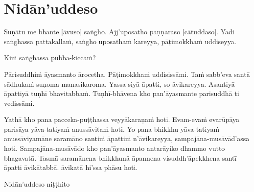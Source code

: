 \section{Nidān'uddeso}
\label{nidan'uddeso}

Suṇātu me bhante [āvuso] saṅgho. Ajj’uposatho paṇṇaraso [cātuddaso]. Yadi saṅghassa pattakallaṁ, saṅgho uposathaṁ kareyya, pāṭimokkhaṁ uddiseyya.

Kiṁ saṅghassa pubba-kiccaṁ?

Pārisuddhiṁ āyasmanto ārocetha. Pāṭimokkhaṁ uddisissāmi. Taṁ sabb'eva santā sādhukaṁ suṇoma manasikaroma. Yassa siyā āpatti, so āvikareyya. Asantiyā āpattiyā tuṇhī bhavitabbaṁ. Tuṇhī-bhāvena kho pan’āyasmante parisuddhā ti vedissāmi.

Yathā kho pana pacceka-puṭṭhassa veyyākaraṇaṁ hoti. Evam-evaṁ evarūpāya parisāya yāva-tatiyaṁ anussāvitaṁ hoti. Yo pana bhikkhu yāva-tatiyaṁ anussāviyamāne saramāno santiṁ āpattiṁ n’āvikareyya, sampajāna-musāvād’assa hoti. Sampajāna-musāvādo kho pan’āyasmanto antarāyiko dhammo vutto bhagavatā. Tasmā saramānena bhikkhunā āpannena visuddh’āpekkhena santī āpatti āvikātabbā. āvikatā hi’ssa phāsu hoti.

\medskip

\begin{outro}
  Nidān’uddeso niṭṭhito
\end{outro}

\clearpage

